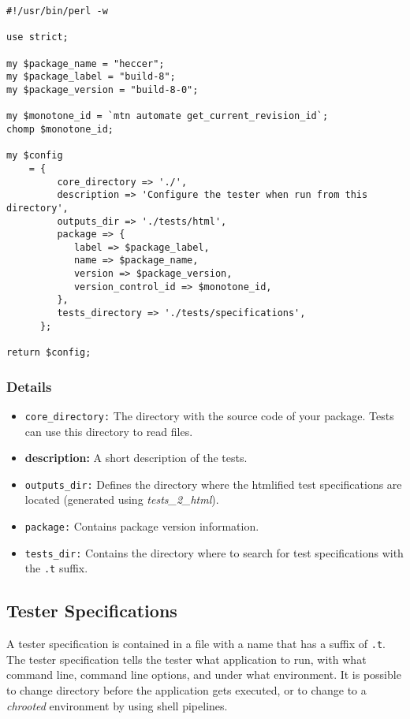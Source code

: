 \documentclass[12pt]{article}
\begin{document}
\begin{verbatim}
#!/usr/bin/perl -w

use strict;

my $package_name = "heccer";
my $package_label = "build-8";
my $package_version = "build-8-0";

my $monotone_id = `mtn automate get_current_revision_id`;
chomp $monotone_id;

my $config
    = {
         core_directory => './',
         description => 'Configure the tester when run from this directory',
         outputs_dir => './tests/html',
         package => {
            label => $package_label,
            name => $package_name,
            version => $package_version,
            version_control_id => $monotone_id,
         },
         tests_directory => './tests/specifications',
      };

return $config;
\end{verbatim}

\subsubsection*{Details}

\begin{itemize}
\item {\tt core\_directory:} The directory with the source code of your package. Tests can use this directory to read files.
\item {\bf description:} A short description of the tests.
\item {\tt outputs\_dir:} Defines the directory where the htmlified test specifications are located (generated using {\it tests\_2\_html}).
\item {\tt package:} Contains package version information.
\item {\tt tests\_dir:} Contains the directory where to search for test specifications with the {\tt .t} suffix. 
\end{itemize}

\subsection*{Tester Specifications}

A tester specification is contained in a file with a name that has a suffix of {\tt .t}. The tester specification tells the tester what application to run, with what command line, command line options, and under what environment. It is possible to change directory before the application gets executed, or to change to a {\it chrooted} environment by using shell pipelines.
\end{document}
